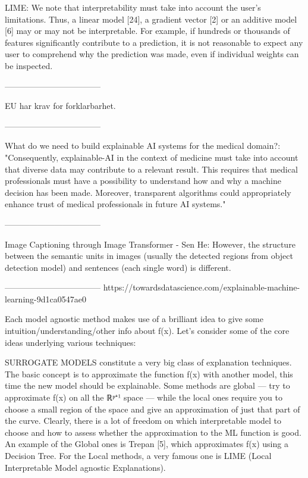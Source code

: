 

LIME:
We note that interpretability must take into account the user’s limitations. Thus, a linear model [24], a gradient vector [2] or an additive model [6] may or may not be interpretable. For example, if hundreds or thousands of features significantly contribute to a prediction, it is not reasonable to expect any user to comprehend why the prediction was made, even if individual weights can be inspected.

-----------------------------------

EU har krav for forklarbarhet. 

-----------------------------------

What do we need to build explainable AI systems for the medical domain?:
"Consequently, explainable-AI in the context of medicine must take into account that diverse data may contribute to a relevant result. This requires that medical professionals must have a possibility to understand how and why a machine decision has been made. Moreover, transparent algorithms could appropriately enhance trust of medical professionals in future AI systems."

-----------------------------------

Image Captioning through Image Transformer - Sen He:
However, the structure between the semantic units in images (usually the detected regions from object detection model) and sentences (each single word) is different.

-----------------------------------
https://towardsdatascience.com/explainable-machine-learning-9d1ca0547ae0

Each model agnostic method makes use of a brilliant idea to give some intuition/understanding/other info about f(x).
Let’s consider some of the core ideas underlying various techniques:

    SURROGATE MODELS constitute a very big class of explanation techniques. The basic concept is to approximate the function f(x) with another model, this time the new model should be explainable.
    Some methods are global — try to approximate f(x) on all the ℝᵖ⁺¹ space — while the local ones require you to choose a small region of the space and give an approximation of just that part of the curve. Clearly, there is a lot of freedom on which interpretable model to choose and how to assess whether the approximation to the ML function is good.
    An example of the Global ones is Trepan [5], which approximates f(x) using a Decision Tree.
    For the Local methods, a very famous one is LIME (Local Interpretable Model agnostic Explanations).
    
